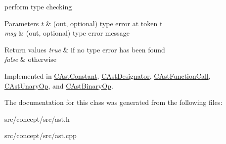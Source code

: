 perform type checking 


\begin{DoxyParams}{Parameters}
{\em t} & (out, optional) type error at token t \\
\hline
{\em msg} & (out, optional) type error message \\
\hline
\end{DoxyParams}

\begin{DoxyRetVals}{Return values}
{\em true} & if no type error has been found \\
\hline
{\em false} & otherwise \\
\hline
\end{DoxyRetVals}


Implemented in \hyperlink{classCAstConstant_a7dcf1fb0ef2da84dcca29a15ff799f6b}{C\-Ast\-Constant}, \hyperlink{classCAstDesignator_a648dc96e88f1005ae41cd220d2bf82d6}{C\-Ast\-Designator}, \hyperlink{classCAstFunctionCall_a74e4ab38c0fd01dcfe8817ad4158e91d}{C\-Ast\-Function\-Call}, \hyperlink{classCAstUnaryOp_a46f64517d4c5c17c205bfd9e7a81779c}{C\-Ast\-Unary\-Op}, and \hyperlink{classCAstBinaryOp_a74ae0aeae3a8c2aabec3c0527bb7d353}{C\-Ast\-Binary\-Op}.



The documentation for this class was generated from the following files\-:\begin{DoxyCompactItemize}
\item 
src/concept/src/ast.\-h\item 
src/concept/src/ast.\-cpp\end{DoxyCompactItemize}
